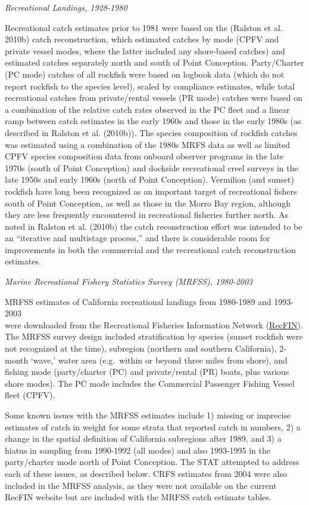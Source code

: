 \documentclass[
  english,
  a4paper,
]{article}
\begin{document}
\emph{Recreational Landings, 1928-1980}

Recreational catch estimates prior to 1981 were based on the (Ralston et al. 2010b) catch reconstruction, which estimated catches by mode (CPFV and private vessel modes, where the latter included any shore-based catches) and estimated catches separately north and south of Point Conception. Party/Charter (PC mode) catches of all rockfish were based on logbook data (which do not report rockfish to the species level), scaled by compliance estimates, while total recreational catches from private/rental vessels (PR mode) catches were based on a combination of the relative catch rates observed in the PC fleet and a linear ramp between catch estimates in the early 1960s and those in the early 1980s (as described in Ralston et al. (2010b)). The species composition of rockfish catches was estimated using a combination of the 1980s MRFS data as well as limited CPFV species composition data from onboard observer programs in the late 1970s (south of Point Conception) and dockside recreational creel surveys in the late 1950s and early 1960s (north of Point Conception). Vermilion (and sunset) rockfish have long been recognized as an important target of recreational fishers south of Point Conception, as well as those in the Morro Bay region, although they are less frequently encountered in recreational fisheries further north. As noted in Ralston et al. (2010b) the catch reconstruction effort was intended to be an ``iterative and multistage process,'' and there is considerable room for improvements in both the commercial and the recreational catch reconstruction estimates.

\emph{Marine Recreational Fishery Statistics Survey (MRFSS), 1980-2003}

MRFSS estimates of California recreational landings from 1980-1989 and 1993-2003\\
were downloaded from the Recreational Fisheries Information Network
(\href{https://www.recfin.org/}{RecFIN}). The MRFSS survey design included stratification by
species (sunset rockfish were not recognized at the time), subregion (northern
and southern California), 2-month `wave,' water area (e.g.~within or beyond
three miles from shore), and fishing mode (party/charter (PC) and private/rental (PR) boats,
plus various shore modes). The PC mode includes the Commercial Passenger Fishing Vessel
fleet (CPFV).

Some known issues with the MRFSS estimates include 1) missing or imprecise estimates of catch
in weight for some strata that reported catch in numbers, 2) a change in the
spatial definition of California subregions after 1989, and 3) a hiatus in
sampling from 1990-1992 (all modes) and also 1993-1995 in the party/charter mode
north of Point Conception. The STAT attempted to address each of these issues,
as described below. CRFS estimates from 2004 were also included in the MRFSS
analysis, as they were not available on the current RecFIN website but are
included with the MRFSS catch estimate tables.
\end{document}
